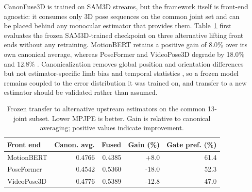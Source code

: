 \documentclass[preprint,12pt]{elsarticle}
\providecommand{\DIFaddbegin}{} %
\providecommand{\DIFaddend}{} %
\providecommand{\DIFadd}[1]{{\protect\color{blue}#1}} %
\begin{document}
 \DIFaddbegin \DIFadd{CanonFuse3D is trained on SAM3D streams, but the framework itself is front-end agnostic: it consumes only 3D pose sequences on the common joint set and can be placed behind any monocular estimator that provides them}\DIFaddend . Table~\ref{tab:frontend_generalization}  \DIFaddbegin \DIFadd{first evaluates the frozen SAM3D-trained checkpoint on three alternative lifting front ends without any retraining. }\DIFaddend MotionBERT retains a positive gain  \DIFaddbegin \DIFadd{of }\DIFaddend 8.0\%  \DIFaddbegin \DIFadd{over its own canonical average}\DIFaddend , whereas PoseFormer and VideoPose3D degrade by 18.0\% and 12.8\% \DIFaddbegin \DIFadd{. Canonicalization removes global position and orientation differences but not }\DIFaddend estimator-specific limb bias and temporal statistics \DIFaddbegin \DIFadd{, so a frozen model remains }\DIFaddend coupled to the  \DIFaddbegin \DIFadd{error distribution it was trained on}\DIFaddend , and transfer to a new estimator  \DIFaddbegin \DIFadd{should be validated rather than assumed}\DIFaddend .

\begin{table}[t]
\centering
\caption{Frozen transfer to alternative upstream estimators on the common 13-joint subset. Lower MPJPE is better. Gain is relative to canonical averaging; positive values indicate improvement.}
\label{tab:frontend_generalization}
\small
\setlength{\tabcolsep}{4pt}
\begin{tabular}{lrrrr}
\toprule
Front end & Canon. avg. & Fused & Gain (\%) & Gate pref. (\%) \\
\midrule
MotionBERT & 0.4766 & 0.4385 & +8.0 & 61.4 \\
PoseFormer & 0.4542 & 0.5360 & -18.0 & 52.3 \\
VideoPose3D & 0.4776 & 0.5389 & -12.8 & 47.0 \\
\bottomrule
\end{tabular}
\end{table}

\end{document}
